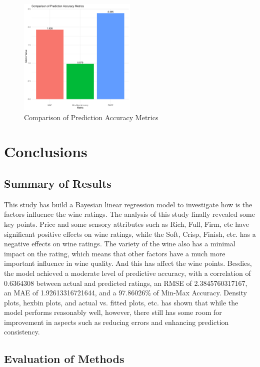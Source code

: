 \documentclass{article}
\begin{document}
\begin{figure}[htbp]
	\centering
	\includegraphics[width=0.5\textwidth]{imgs/Prediction_Accuracy_Metrics.pdf}
	\caption{Comparison of Prediction Accuracy Metrics}
	\label{fig:Prediction_Accuracy_Metrics}
\end{figure}

\section{Conclusions}\label{sec:conclusion}

\subsection{Summary of Results}

This study has build a Bayesian linear regression model to investigate how is the factors influence the wine ratings. The analysis of this study finally revealed some key points. Price and some sensory attributes such as Rich, Full, Firm, etc have significant positive effects on wine ratings, while the Soft, Crisp, Finish, etc. has a negative effects on wine ratings. The variety of the wine also has a minimal impact on the rating, which means that other factors have a much more important influence in wine quality. And this has affect the wine points. Besdies, the model achieved a moderate level of predictive accuracy, with a correlation of 0.6364308 between actual and predicted ratings, an RMSE of 2.3845760317167, an MAE of 1.92613316721644, and a 97.86026\% of Min-Max Accuracy. Density plots, hexbin plots, and actual vs. fitted plots, etc. has shown that while the model performs reasonably well, however, there still has some room for improvement in aspects such as reducing errors and enhancing prediction consistency.

\subsection{Evaluation of Methods}
\end{document}

